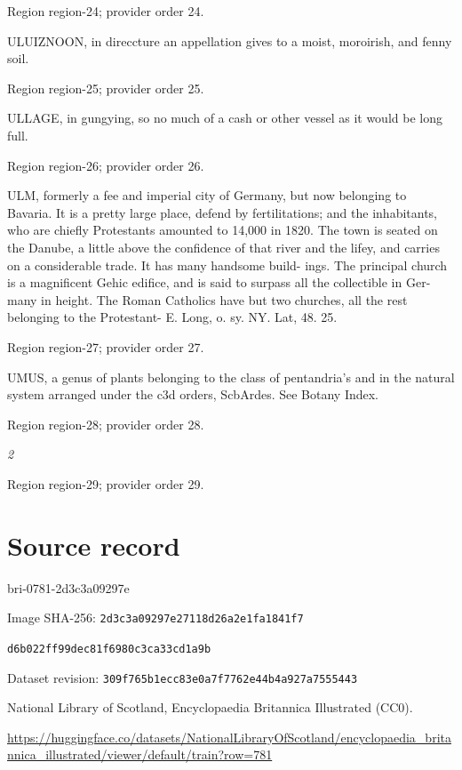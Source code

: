 \documentclass[11pt]{article}
\begin{document}
{\scriptsize\color{gray} Region region-24; provider order 24.\par}
\medskip

ULUIZNOON, in direccture an appellation gives
to a moist, moroirish, and fenny soil.
\par

{\scriptsize\color{gray} Region region-25; provider order 25.\par}
\medskip

ULLAGE, in gungying, so no much of a cash or other vessel as it would be long full.
\par

{\scriptsize\color{gray} Region region-26; provider order 26.\par}
\medskip

ULM, formerly a fee and imperial city of Germany,
but now belonging to Bavaria. It is a pretty large
place, defend by fertilitations; and the inhabitants,
who are chiefly Protestants amounted to 14,000 in 1820.
The town is seated on the Danube, a little above the
confidence of that river and the lifey, and carries on
a considerable trade. It has many handsome build-
ings. The principal church is a magnificent Gehic
edifice, and is said to surpass all the collectible in Ger-
many in height. The Roman Catholics have but two
 churches, all the rest belonging to the Protestant-
E. Long, o. sy. NY. Lat, 48. 25.
\par

{\scriptsize\color{gray} Region region-27; provider order 27.\par}
\medskip

UMUS, a genus of plants belonging to the class
of pentandria's and in the natural system arranged under
the c3d orders, ScbArdes. See Botany Index.
\par

{\scriptsize\color{gray} Region region-28; provider order 28.\par}
\medskip

{\small\itshape 2\par}

{\scriptsize\color{gray} Region region-29; provider order 29.\par}
\medskip
\newpage\section*{Source record}
bri-0781-2d3c3a09297e\par
Image SHA-256: \texttt{2d3c3a09297e27118d26a2e1fa1841f7}\par\texttt{d6b022ff99dec81f6980c3ca33cd1a9b}\par
Dataset revision: \texttt{309f765b1ecc83e0a7f7}\texttt{762e44b4a927a7555443}\par
National Library of Scotland, Encyclopaedia Britannica Illustrated (CC0).\par
\url{https://huggingface.co/datasets/NationalLibraryOfScotland/encyclopaedia_britannica_illustrated/viewer/default/train?row=781}
\end{document}
